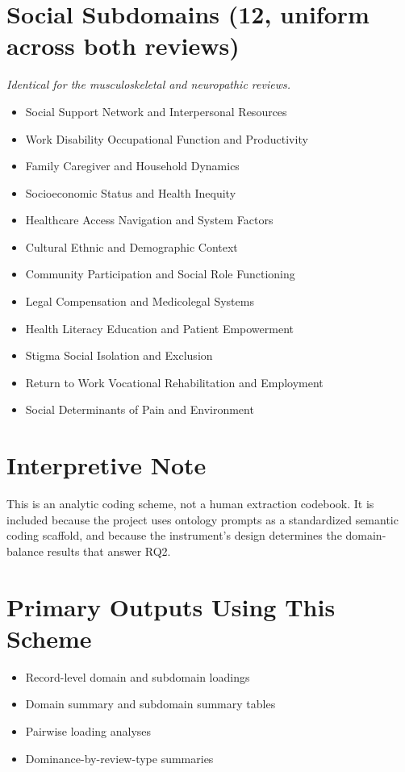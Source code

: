 \documentclass[11pt]{article}
\begin{document}
\section*{Social Subdomains (12, uniform across both reviews)}
{\small\itshape Identical for the musculoskeletal and neuropathic reviews.}\par\smallskip
\begin{itemize}
\item Social Support Network and Interpersonal Resources
\item Work Disability Occupational Function and Productivity
\item Family Caregiver and Household Dynamics
\item Socioeconomic Status and Health Inequity
\item Healthcare Access Navigation and System Factors
\item Cultural Ethnic and Demographic Context
\item Community Participation and Social Role Functioning
\item Legal Compensation and Medicolegal Systems
\item Health Literacy Education and Patient Empowerment
\item Stigma Social Isolation and Exclusion
\item Return to Work Vocational Rehabilitation and Employment
\item Social Determinants of Pain and Environment
\end{itemize}

\section*{Interpretive Note}
This is an analytic coding scheme, not a human extraction codebook. It is included because the project uses ontology prompts as a standardized semantic coding scaffold, and because the instrument's design determines the domain-balance results that answer RQ2.


\section*{Primary Outputs Using This Scheme}
\begin{itemize}
\item Record-level domain and subdomain loadings
\item Domain summary and subdomain summary tables
\item Pairwise loading analyses
\item Dominance-by-review-type summaries
\end{itemize}
\end{document}
